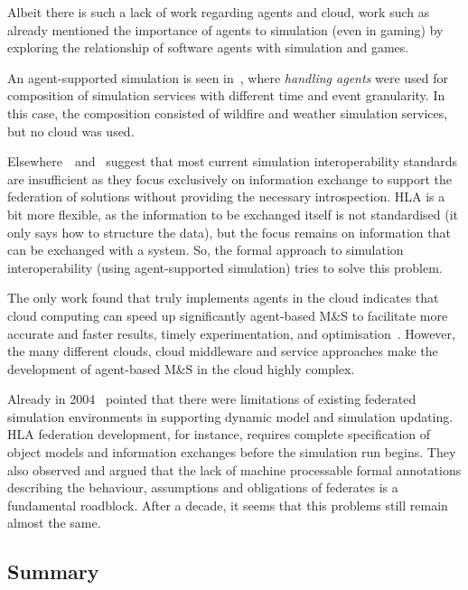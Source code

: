 \documentclass[conference]{IEEEtran}
\begin{document}
Albeit there is such a lack of work regarding agents and cloud, work such as~\cite{Yilmaz01092006} already mentioned the importance of agents to simulation (even in gaming) by exploring the relationship of software agents with simulation and games.

An agent-supported simulation is seen in~\cite{Guo:2012:TGE:2346616.2346654}, where \textit{handling agents} were used for composition of simulation services with different time and event granularity. In this case, the composition consisted of wildfire and weather simulation services, but no cloud was used.

Elsewhere~\cite{Tolk:2010:UFA:2433508.2433550}~and~\cite{Tolk:2011:MTI:2431518.2431551} suggest that most current simulation interoperability standards are insufficient as they focus exclusively on information exchange to support the federation of solutions without providing the necessary introspection. HLA is a bit more flexible, as the information to be exchanged itself is not standardised (it only says how to structure the data), but the focus remains on information that can be exchanged with a system. So, the formal approach to simulation interoperability (using agent-supported simulation) tries to solve this problem.

The only work found that truly implements agents in the cloud indicates that cloud computing can speed up significantly agent-based M\&S to facilitate more accurate and faster results, timely experimentation, and optimisation~\cite{Taylor:2014:TCC:2693848.2693884}. However, the many different clouds, cloud middleware and service approaches make the development of agent-based M\&S in the cloud highly complex.

Already in 2004~\cite{Yilmaz01092006} pointed that there were limitations of existing federated simulation environments in supporting dynamic model and simulation updating. HLA federation development, for instance, requires complete specification of object models and information exchanges before the simulation run begins. They also observed and argued that the lack of machine processable formal annotations describing the behaviour, assumptions and obligations of federates is a fundamental roadblock. After a decade, it seems that this problems still remain almost the same.

\subsection{Summary}
\end{document}
